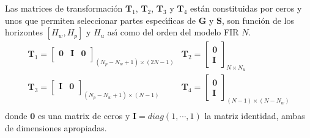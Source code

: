 Las matrices de transformaci{\'o}n $\mathbf{T}_{1}$, $\mathbf{T}_{2}$, $\mathbf{T}_{3}$ y $\mathbf{T}_{4}$ est{\'a}n
constituidas por ceros y unos que permiten seleccionar partes espec{\'\i}ficas de $\mathbf{G}$ y $\mathbf{S}$,
son funci{\'o}n de los horizontes $[H_w,H_p]$ y $H_u$ as{\'\i} como del orden del modelo FIR $N$.
\begin{equation}
\begin{array}{ll}
  \mathbf{T}_1=\left[
    \begin{array}{ccc}
     \mathbf{0} & \mathbf{I} & \mathbf{0} \\
    \end{array}
    \right]_{(N_p-N_w+1)\times (2N-1)}
  & \mathbf{T}_2=\left[
    \begin{array}{c}
    \mathbf{0}\\
    \mathbf{I}
    \end{array}
    \right]_{N\times N_u} \\
  \mathbf{T}_3=\left[
    \begin{array}{cc}
     \mathbf{I} & \mathbf{0}\\
    \end{array}
    \right]_{(N_p-N_w+1)\times (N-1)}
  & \mathbf{T}_4=\left[
    \begin{array}{c}
    \mathbf{0}\\
    \mathbf{I}
    \end{array}
    \right]_{(N-1)\times (N-N_w)} \\
\end{array}
\end{equation}
donde $\mathbf{0}$ es una matrix de ceros y $\mathbf{I}=diag(1,\cdots,1)$ la matriz identidad, ambas de
dimensiones apropiadas.


